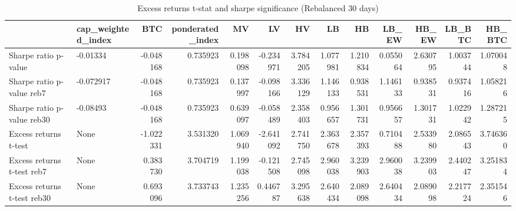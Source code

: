 \begin{table}
\centering
\caption{Excess returns t-stat and sharpe significance (Rebalanced 30 days)}
\label{signif100_30}
\begin{tabular}{llrrrrrrrrrrr}
\toprule
{} & cap\_weighted\_index &       BTC &  ponderated\_index &        MV &        LV &        HV &        LB &        HB &     LB\_EW &     HB\_EW &    LB\_BTC &    HB\_BTC \\
\midrule
Sharpe ratio p-value        &           -0.01334 & -0.048168 &          0.735923 &  0.198098 & -0.234971 &  3.784205 &  1.077981 &  1.210834 &  0.055064 &  2.630795 &  1.003744 &  1.070048 \\
Sharpe ratio p-value reb7   &          -0.072917 & -0.048168 &          0.735923 &  0.137997 & -0.098166 &  3.336129 &  1.146133 &  0.938531 &  1.146133 &  0.938531 &  0.937416 &  1.058216 \\
Sharpe ratio p-value reb30  &           -0.08493 & -0.048168 &          0.735923 &  0.639097 & -0.058489 &  2.358403 &  0.956657 &  1.301731 &  0.956657 &  1.301731 &  1.022942 &  1.287215 \\
Excess returns t-test       &               None & -1.022331 &          3.531320 &  1.069940 & -2.641092 &  2.741750 &  2.363678 &  2.357393 &  0.710488 &  2.533980 &  2.086543 &  3.746360 \\
Excess returns t-test reb7  &               None &  0.383730 &          3.704719 &  1.199038 & -0.121508 &  2.745098 &  2.960038 &  3.239903 &  2.960038 &  3.239903 &  2.440247 &  3.251834 \\
Excess returns t-test reb30 &               None &  0.693096 &          3.733743 &  1.235256 &  0.446787 &  3.295638 &  2.640434 &  2.089098 &  2.640434 &  2.089098 &  2.217724 &  2.351546 \\
\bottomrule
\end{tabular}
\end{table}
